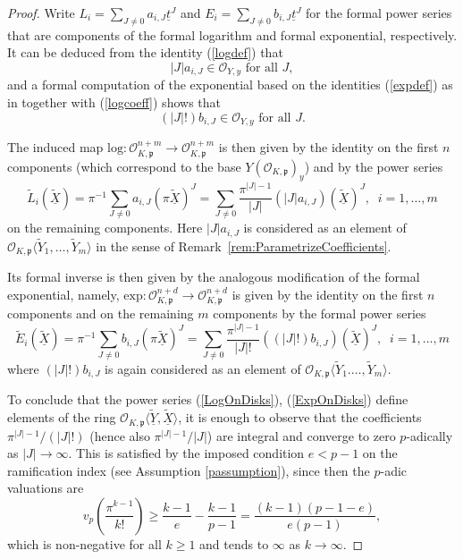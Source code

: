 \documentclass[11pt,oneside]{amsart}
\theoremstyle{plain}
\theoremstyle{definition}
\def\oh{\mathcal{O}}
\begin{document}
\begin{proof}
Write $L_i=\sum_{J \neq 0}a_{i, J}\underline{t}^J$ and $E_i=\sum_{J \neq 0}b_{i, J}\underline{t}^J$ for the formal power series that are components of the formal logarithm and formal exponential, respectively. It can be deduced from the identity (\ref{logdef}) that
\begin{equation}\label{logcoeff}
|J|a_{i, J} \in \oh_{Y, y} \text{ for all }J,
\end{equation}
and a formal computation of the exponential based on the identities (\ref{expdef}) as in \cite[A.4.6]{hazewinkel} together with (\ref{logcoeff}) shows that 
\begin{equation}\label{expcoeff}
(|J|!)b_{i, J} \in \oh_{Y, y} \text{ for all }J.
\end{equation}

The induced map $\mathrm{log}: \oh_{K, \mathfrak{p}}^{n+m}\rightarrow \oh_{K, \mathfrak{p}}^{n+m}$ is then given by the identity on the first $n$ components (which correspond to the base $Y(\oh_{K, \mathfrak{p}})_y$) and by the power series 
\begin{equation}\label{LogOnDisks}
\tilde{L}_i(\underline{\tilde{X}})=\pi^{-1} \sum_{J \neq 0}a_{i, J}(\pi \underline{\tilde{X}})^J=\sum_{J \neq 0}\frac{\pi^{|J|-1}}{|J|}(|J|a_{i, J})(\underline{\tilde{X}})^J, \;\;i=1, \dots, m
\end{equation}
on the remaining components. Here $|J|a_{i, J}$ is considered as an element of $\oh_{K, \mathfrak{p}}\langle \tilde{Y}_1, \dots, \tilde{Y}_m\rangle$ in the sense of Remark~\ref{rem:ParametrizeCoefficients}.

Its formal inverse is then given by the analogous modification of the formal exponential, namely, $\mathrm{exp}: \oh_{K, \mathfrak{p}}^{n+d}\rightarrow \oh_{K, \mathfrak{p}}^{n+d}$ is given by the identity on the first $n$ components and on the remaining $m$ components by the formal power series
\begin{equation}\label{ExpOnDisks}
\tilde{E}_i(\underline{\tilde{X}})=\pi^{-1} \sum_{J \neq 0}b_{i, J}(\pi \underline{\tilde{X}})^J=\sum_{J \neq 0}\frac{\pi^{|J|-1}}{|J|!}((|J|!)b_{i, J})(\underline{\tilde{X}})^J, \;\;i=1, \dots, m
\end{equation}
where $(|J|!)b_{i, J}$ is again considered as an element of $\oh_{K, \mathfrak{p}}\langle \tilde{Y}_1. \dots, \tilde{Y}_m \rangle$.

To conclude that the power series (\ref{LogOnDisks}), (\ref{ExpOnDisks}) define elements of the ring $\oh_{K, \mathfrak{p}}\langle \underline{\tilde{Y}}, \underline{\tilde{X}}\rangle$, it is enough to observe that the coefficients $\pi^{|J|-1}/(|J|!)$ (hence also $\pi^{|J|-1}/|J|$) are integral and converge to zero $p$-adically as $|J|\rightarrow \infty$. This is satisfied by the imposed condition $e < p-1$ on the ramification index (see Assumption \ref{passumption}), since then the $p$-adic valuations are
$$v_p\left(\frac{\pi^{k-1}}{k!}\right)\geq \frac{k-1}{e}-\frac{k-1}{p-1}=\frac{(k-1)(p-1-e)}{e(p-1)},$$
which is non-negative for all $k\geq 1$ and tends to $\infty$ as $k \rightarrow \infty$. 


\end{proof}
\end{document}
